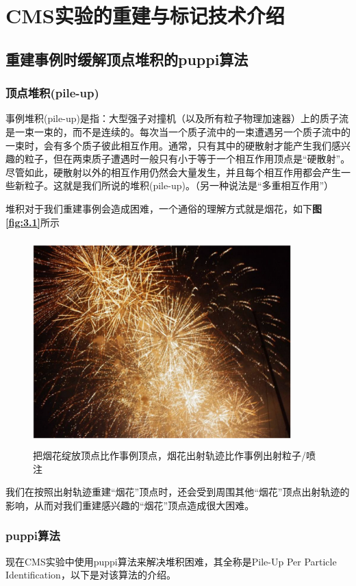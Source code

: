 \chapter{CMS实验的重建与标记技术介绍}
\label{chap3}
\fontsize{12bp}{14.4pt}
\section{重建事例时缓解顶点堆积的puppi算法}
\subsection{顶点堆积(pile-up)}
事例堆积(pile-up)是指：大型强子对撞机（以及所有粒子物理加速器）上的质子流是一束一束的，而不是连续的。每次当一个质子流中的一束遭遇另一个质子流中的一束时，会有多个质子彼此相互作用。通常，只有其中的硬散射才能产生我们感兴趣的粒子，但在两束质子遭遇时一般只有小于等于一个相互作用顶点是“硬散射”。尽管如此，硬散射以外的相互作用仍然会大量发生，并且每个相互作用都会产生一些新粒子。这就是我们所说的堆积(pile-up)。（另一种说法是“多重相互作用”）

堆积对于我们重建事例会造成困难，一个通俗的理解方式就是烟花，如下\textbf{图\ref{fig:3.1}}所示
\begin{figure}[H]
 \centering
 \includegraphics[height=8cm, width=10cm]{pictures/firework.png}
 \caption{把烟花绽放顶点比作事例顶点，烟花出射轨迹比作事例出射粒子/喷注}
 \label{fig:2.1}
\end{figure}
我们在按照出射轨迹重建“烟花”顶点时，还会受到周围其他“烟花”顶点出射轨迹的影响，从而对我们重建感兴趣的“烟花”顶点造成很大困难。

\subsection{puppi算法}
现在CMS实验中使用puppi算法来解决堆积困难，其全称是Pile-Up Per Particle Identification\cite{Pileup_Per_Particle_Identification}，以下是对该算法的介绍。

